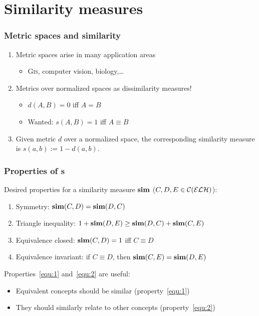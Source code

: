 \documentclass[smaller, dvipsnames]{beamer}
\newcounter{simprop}
\newcommand{\propstop}{\setcounter{simprop}{\theenumi}}
\begin{document}
\section{Similarity measures}

\begin{frame}
  \frametitle{Metric spaces and similarity}
  \begin{enumerate}[<+->]
    \item \alert{Metric spaces} arise in many application areas
    \begin{itemize}
      \item \textsc{Gis}, computer vision, biology,\ldots
    \end{itemize}
    \item Metrics over normalized spaces as \alert{dissimilarity} measures!
    \begin{itemize}
      \item \(d(A,B) = 0\) iff \(A = B\)
      \item Wanted: \(s(A,B) = 1\) iff \(A \equiv B\)
    \end{itemize}
    \item Given metric \(d\) over a normalized space,
    the corresponding \alert{similarity} measure is
    \(s(a,b) := 1 - d(a,b)\).
  \end{enumerate}  
\end{frame}

\begin{frame}
  \frametitle{Properties of \csm{}s}
  Desired properties for a 
  \alert{similarity measure} \(\operatorname{\mathbf{sim}}\) (\(C,D,E \in \mathcal{C}(\mathcal{ELH})\)):
  \begin{enumerate}[<+->]
    \item \alert{Symmetry}: \(\operatorname{\mathbf{sim}}(C,D) = \operatorname{\mathbf{sim}}(D,C)\)
    \item \alert{Triangle inequality}:
      \(1 + \operatorname{\mathbf{sim}}(D,E) \ge \operatorname{\mathbf{sim}}(D,C) + \operatorname{\mathbf{sim}}(C,E)\)
    \item\label{equ:1} \alert{Equivalence closed}:
      \(\operatorname{\mathbf{sim}}(C,D) = 1\) iff \(C \equiv D\)
    \item\label{equ:2} \alert{Equivalence invariant}:
      if \(C \equiv D\), then
      \(\operatorname{\mathbf{sim}}(C,E) = \operatorname{\mathbf{sim}}(D,E)\)
    \propstop
  \end{enumerate}
  \onslide<+->
  Properties~\ref{equ:1} and~\ref{equ:2} are useful:
  \begin{itemize}
    \item Equivalent concepts should be similar (property~\ref{equ:1})
    \item They should similarly relate to other concepts (property~\ref{equ:2})
  \end{itemize}
\end{frame}
\end{document}
